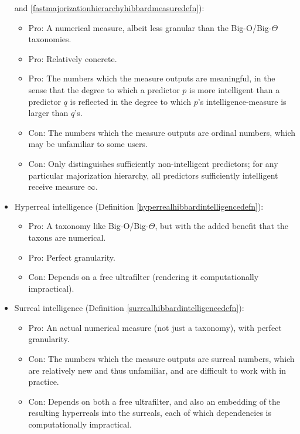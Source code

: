 \documentclass[twoside,11pt]{article}
\begin{document}
\begin{itemize}
    and \ref{fastmajorizationhierarchyhibbardmeasuredefn}):
    \begin{itemize}
        \item
        Pro: A numerical measure, albeit less granular than the
        Big-O/Big-$\Theta$ taxonomies.
        \item
        Pro: Relatively concrete.
        \item
        Pro: The numbers which the measure outputs are meaningful, in the sense that
        the degree to which a predictor $p$ is more intelligent than a
        predictor $q$ is reflected
        in the degree to which $p$'s intelligence-measure is larger than $q$'s.
        \item
        Con: The numbers which the measure outputs are ordinal numbers, which may be
        unfamiliar to some users.
        \item
        Con: Only distinguishes sufficiently non-intelligent predictors; for any particular
        majorization hierarchy, all predictors
        sufficiently intelligent receive measure $\infty$.
    \end{itemize}
    \item
    Hyperreal intelligence (Definition \ref{hyperrealhibbardintelligencedefn}):
    \begin{itemize}
        \item
        Pro: A taxonomy like Big-O/Big-$\Theta$, but with the added benefit
        that the taxons are numerical.
        \item
        Pro: Perfect granularity.
        \item
        Con: Depends on a free ultrafilter (rendering it
        computationally impractical).
    \end{itemize}
    \item
    Surreal intelligence (Definition \ref{surrealhibbardintelligencedefn}):
    \begin{itemize}
        \item
        Pro: An actual numerical measure (not just a taxonomy), with
        perfect granularity.
        \item
        Con: The numbers which the measure outputs are surreal numbers,
        which are relatively new and thus unfamiliar, and are difficult
        to work with in practice.
        \item
        Con: Depends on both a free ultrafilter, and also an embedding of
        the resulting hyperreals into the surreals, each of which dependencies
        is computationally impractical.
    \end{itemize}
\end{itemize}
\end{document}
